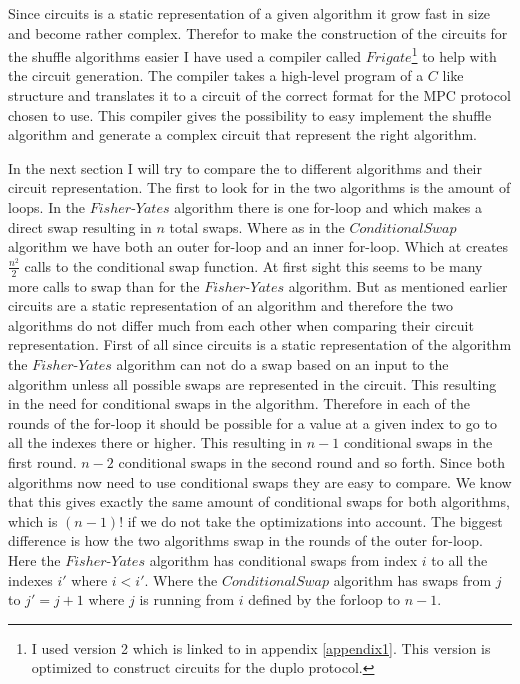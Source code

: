 

Since circuits is a static representation of a given algorithm it grow fast in size and become rather complex. Therefor to make the construction of the circuits for the shuffle algorithms easier I have used a compiler called $Frigate$\footnote{I used version 2 which is linked to in appendix \ref{appendix1}. This version is optimized to construct circuits for the duplo protocol.} to help with the circuit generation. The compiler takes a high-level program of a $C$ like structure and translates it to a circuit of the correct format for the MPC protocol chosen to use. This compiler gives the possibility to easy implement the shuffle algorithm and generate a complex circuit that represent the right algorithm.

\bigskip
In the next section I will try to compare the to different algorithms and their circuit representation. The first to look for in the two algorithms is the amount of loops. In the $Fisher\text{-}Yates$ algorithm there is one for-loop and which makes a direct swap resulting in $n$ total swaps. Where as in the $Conditional Swap$ algorithm we have both an outer for-loop and an inner for-loop. Which at creates $\frac{n^2}{2}$ calls to the conditional swap function. At first sight this seems to be many more calls to swap than for the $Fisher\text{-}Yates$ algorithm. But as mentioned earlier circuits are a static representation of an algorithm and therefore the two algorithms do not differ much from each other when comparing their circuit representation. First of all since circuits is a static representation of the algorithm the $Fisher\text{-}Yates$ algorithm can not do a swap based on an input to the algorithm unless all possible swaps are represented in the circuit. This resulting in the need for conditional swaps in the algorithm. Therefore in each of the rounds of the for-loop it should be possible for a value at a given index to go to all the indexes there or higher. This resulting in $n-1$ conditional swaps in the first round. $n-2$ conditional swaps in the second round and so forth. Since both algorithms now need to use conditional swaps they are easy to compare. We know that this gives exactly the same amount of conditional swaps for both algorithms, which is $(n-1)!$ if we do not take the optimizations into account. The biggest difference is how the two algorithms swap in the rounds of the outer for-loop. Here the $Fisher\text{-}Yates$ algorithm has conditional swaps from index $i$ to all the indexes $i'$ where $i<i'$. Where the $Conditional Swap$ algorithm has swaps from $j$ to $j'= j+1$ where $j$ is running from $i$ defined by the forloop to $n-1$.

